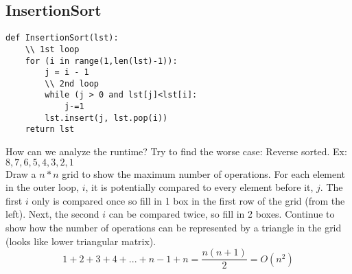 \documentclass[pdf]{article}
\begin{document}
\subsection{InsertionSort}
\begin{lstlisting}
def InsertionSort(lst):
	\\ 1st loop
	for (i in range(1,len(lst)-1)):
		j = i - 1
		\\ 2nd loop
		while (j > 0 and lst[j]<lst[i]:
			j-=1
		lst.insert(j, lst.pop(i))
	return lst
\end{lstlisting}	
How can we analyze the runtime? Try to find the worse case: Reverse sorted. Ex: $8,7,6,5,4,3,2,1$\\
Draw a $n*n$ grid to show the maximum number of operations. For each element in the outer loop, $i$, it is potentially compared to every element before it, $j$. The first $i$ only is compared once so fill in 1 box in the first row of the grid (from the left). Next, the second $i$ can be compared twice, so fill in 2 boxes. Continue to show how the number of operations can be represented by a triangle in the grid (looks like lower triangular matrix). 
\[1+2+3+4+...+n-1+n = \frac{n(n+1)}{2} = O(n^2) \]
\end{document}
